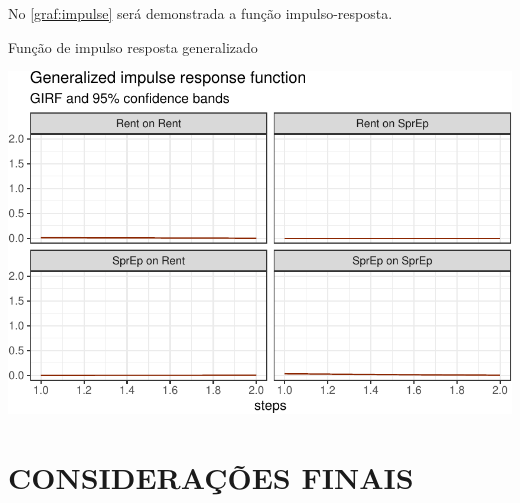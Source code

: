 \documentclass[
  12pt,
  12pt,
  openright,
  oneside,
  a4paper,
  chapter=TITLE,
  section=TITLE,
  subsection=TITLE,
  subsubsection=TITLE,
  english,
  portugues,
  sumario=tradicional]{abntex2}
\begin{document}
No \autoref{graf:impulse} será demonstrada a função impulso-resposta.

\vspace{20pt}

\begin{grafico}[!htbp]
\caption{Função de impulso resposta generalizado}
\vspace{-4mm}

\begin{center}\includegraphics{12-exportedfigures/impulse.plot-1} \end{center}
\vspace{-3mm}
\label{graf:impulse}
\vspace{-2mm}
\end{grafico}

\postextual


\chapter*[Conclusão]{CONSIDERAÇÕES FINAIS}

\postextual

\printbibliography[title=\hspace{45pt}{REFERÊNCIAS}]
\end{document}
